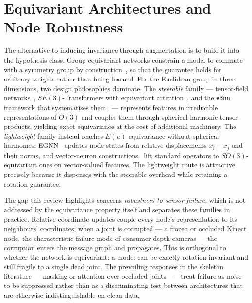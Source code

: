 \documentclass[11pt]{article}
\begin{document}
\section{Equivariant Architectures and Node Robustness}
The alternative to inducing invariance through augmentation is to build it into the hypothesis class.
Group-equivariant networks constrain a model to commute with a symmetry group by
construction~\cite{cohen2016gconv}, so that the guarantee holds for arbitrary weights rather than being
learned. For the Euclidean group in three dimensions, two design philosophies dominate. The
\emph{steerable} family --- tensor-field networks~\cite{thomas2018tfn}, $SE(3)$-Transformers with
equivariant attention~\cite{fuchs2020se3transformer}, and the \texttt{e3nn} framework that systematises
them~\cite{geiger2022e3nn} --- represents features in irreducible representations of $O(3)$ and couples
them through spherical-harmonic tensor products, yielding exact equivariance at the cost of additional
machinery. The \emph{lightweight} family instead reaches $E(n)$-equivariance without spherical harmonics:
EGNN~\cite{satorras2021egnn} updates node states from relative displacements $x_i-x_j$ and their norms,
and vector-neuron constructions~\cite{deng2021vectorneurons} lift standard operators to $SO(3)$-equivariant
ones on vector-valued features. The lightweight route is attractive precisely because it dispenses with
the steerable overhead while retaining a rotation guarantee.

The gap this review highlights concerns \emph{robustness to sensor failure}, which is not addressed by
the equivariance property itself and separates these families in practice. Relative-coordinate updates
couple every node's representation to its neighbours' coordinates; when a joint is corrupted --- a frozen
or occluded Kinect node, the characteristic failure mode of consumer depth cameras --- the corruption
enters the message graph and propagates. This is orthogonal to whether the network is equivariant: a
model can be exactly rotation-invariant and still fragile to a single dead joint. The prevailing
responses in the skeleton literature --- masking or attention over occluded joints~\cite{yan2018stgcn}
--- treat failure as noise to be suppressed rather than as a discriminating test between architectures
that are otherwise indistinguishable on clean data.
\end{document}
